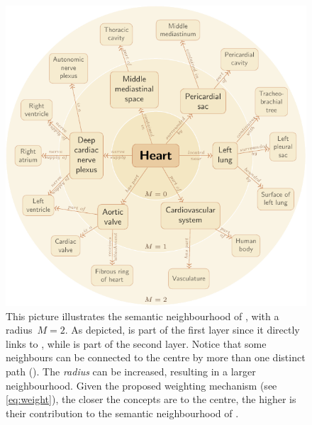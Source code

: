 \begin{figure}[!b]
    \centering
    \includegraphics{images/heart-neighbourhood.pdf}
    \caption[The semantic neighbourhood of the concept ]{This picture illustrates the semantic neighbourhood of , with a radius~$M=2$. As depicted,  is part of the first layer since it directly links to , while  is part of the second layer. Notice that some neighbours can be connected to the centre by more than one distinct path (\eg {}). The \emph{radius} can be increased, resulting in a larger neighbourhood. Given the proposed weighting mechanism (see \eqref{eq:weight}), the closer the concepts are to the centre, the higher is their contribution to the semantic neighbourhood of .}
    \label{fig:heart-neighbourhood}
\end{figure}

